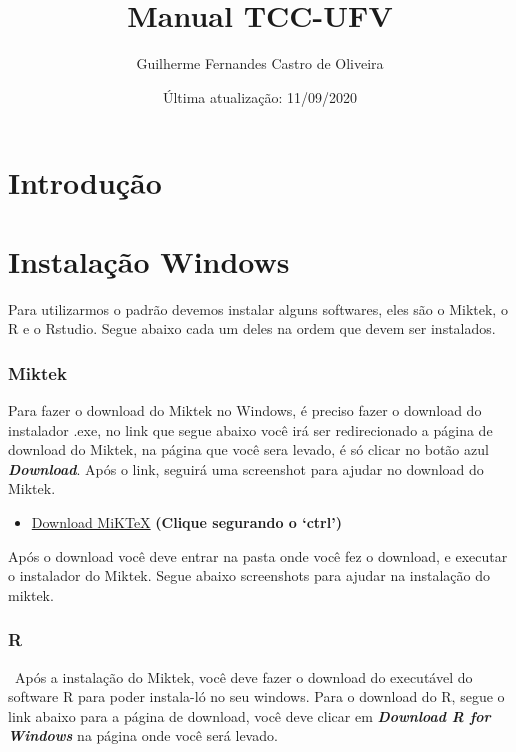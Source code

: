 \documentclass[
]{article}
\title{Manual TCC-UFV}
\author{Guilherme Fernandes Castro de Oliveira}
\date{Última atualização: 11/09/2020}
\providecommand{\tightlist}{%
  \setlength{\itemsep}{0pt}\setlength{\parskip}{0pt}}
\begin{document}
\maketitle

{
\setcounter{tocdepth}{2}
\tableofcontents
}
\hypertarget{introduuxe7uxe3o}{%
\section*{Introdução}\label{introduuxe7uxe3o}}

\hypertarget{instalauxe7uxe3o-windows}{%
\section{Instalação Windows}\label{instalauxe7uxe3o-windows}}

Para utilizarmos o padrão devemos instalar alguns softwares, eles são o Miktek, o R e o Rstudio. Segue abaixo cada um deles na ordem que devem ser instalados.

\hypertarget{miktek}{%
\subsubsection{Miktek}\label{miktek}}

Para fazer o download do Miktek no Windows, é preciso fazer o download do instalador .exe, no link que segue abaixo você irá ser redirecionado a página de download do Miktek, na página que você sera levado, é só clicar no botão azul \textbf{\emph{Download}}. Após o link, seguirá uma screenshot para ajudar no download do Miktek.

\begin{itemize}
\tightlist
\item
  \href{https://miktex.org/download}{Download MiKTeX} \textbf{(Clique segurando o `ctrl')}
\end{itemize}

Após o download você deve entrar na pasta onde você fez o download, e executar o instalador do Miktek. Segue abaixo screenshots para ajudar na instalação do miktek.

\hypertarget{r}{%
\subsubsection{R}\label{r}}

~Após a instalação do Miktek, você deve fazer o download do executável do software R para poder instala-ló no seu windows. Para o download do R, segue o link abaixo para a página de download, você deve clicar em \textbf{\emph{Download R for Windows}} na página onde você será levado.
\end{document}

